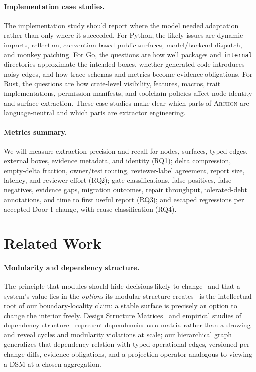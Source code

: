 \documentclass[sigconf,review,anonymous]{acmart}
\theoremstyle{plain}
\theoremstyle{definition}
\begin{document}
\paragraph{Implementation case studies.}
The implementation study should report where the model needed adaptation rather
than only where it succeeded. For Python, the likely issues are dynamic imports,
reflection, convention-based public surfaces, model/backend dispatch, and
monkey patching. For Go, the questions are how well packages and
\texttt{internal} directories approximate the intended boxes, whether generated
code introduces noisy edges, and how trace schemas and metrics become evidence
obligations. For Rust, the questions are how crate-level visibility, features,
macros, trait implementations, permission manifests, and toolchain policies
affect node identity and surface extraction. These case studies make clear which
parts of \textsc{Archon} are language-neutral and which parts are extractor
engineering.

\paragraph{Metrics summary.}
We will measure extraction precision and recall for nodes, surfaces, typed
edges, external boxes, evidence metadata, and identity (RQ1); delta compression,
empty-delta fraction, owner/test routing, reviewer-label agreement, report size,
latency, and reviewer effort (RQ2); gate classifications, false positives, false
negatives, evidence gaps, migration outcomes, repair throughput,
tolerated-debt annotations, and time to first useful report (RQ3); and escaped
regressions per accepted Door-1 change, with cause classification (RQ4).

\section{Related Work}\label{sec:related}

\paragraph{Modularity and dependency structure.}
The principle that modules should hide decisions likely to
change~\cite{parnas1972criteria} and that a system's value lies in the
\emph{options} its modular structure creates~\cite{baldwin2000design} is the
intellectual root of our boundary-locality claim: a stable surface is precisely
an option to change the interior freely. Design Structure
Matrices~\cite{sangal2005using} and empirical studies of dependency
structure~\cite{maccormack2006exploring} represent dependencies as a matrix
rather than a drawing and reveal cycles and modularity violations at scale; our
hierarchical graph generalizes that dependency relation with typed operational
edges, versioned per-change diffs, evidence obligations, and a projection
operator analogous to viewing a DSM at a chosen aggregation.
\end{document}
